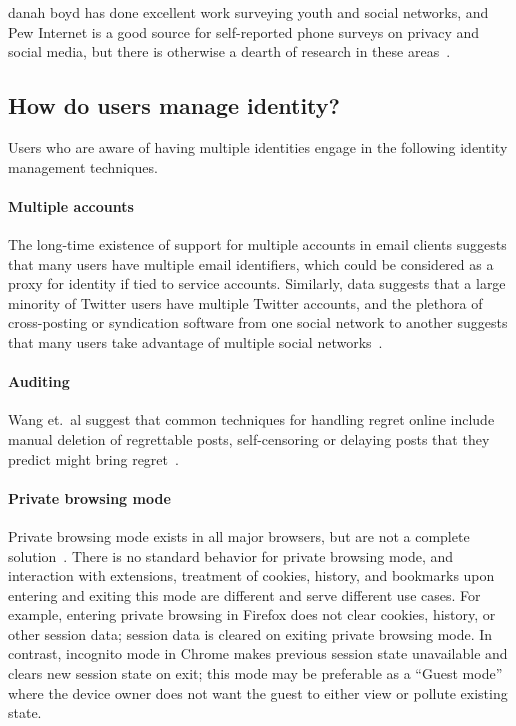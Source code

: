 \documentclass[10pt, conference, compsocconf]{IEEEtran}
\begin{document}
danah boyd has done excellent work surveying youth and social networks, and Pew
Internet is a good source for self-reported phone surveys on privacy and social
media, but there is otherwise a dearth of research in these
areas~\cite{boyd,pew1,pew2,pew3}.

\subsection{How do users manage identity?}

Users who are aware of having multiple identities engage in the following
identity management techniques.

\paragraph{Multiple accounts}
The long-time existence of support for multiple accounts in email clients
suggests that many users have multiple email identifiers, which could be
considered as a proxy for identity if tied to service accounts. Similarly, data
suggests that a large minority of Twitter users have multiple Twitter accounts,
and the plethora of cross-posting or syndication software from one social
network to another suggests that many users take advantage of multiple social
networks~\cite{twitter}.
\begin{comment}
That is not to say that all users have the same
tolerance or even need for multiple explicit identities: in fact many users may
be exclusively task-oriented and use the Internet with specific tasks in mind
rather than for social interaction or exploratory surfing\footnote{Even these
users are subject to building implicit identities through the use of tracking
techniques, however.}.
\end{comment}

\paragraph{Auditing}
Wang et.~al suggest that common techniques for handling regret online include
manual deletion of regrettable posts, self-censoring or delaying
posts that they predict might bring regret~\cite{wang}.

\paragraph{Private browsing mode}
Private browsing mode exists in all major browsers, but are not a complete
solution~\cite{ABBJ10}. There is no standard behavior for private browsing
mode, and interaction with extensions, treatment of cookies, history, and
bookmarks upon entering and exiting this mode are different and serve different
use cases. For example, entering private browsing in Firefox does not clear
cookies, history, or other session data; session data is cleared on exiting
private browsing mode. In contrast, incognito mode in Chrome makes previous
session state unavailable and clears new session state on exit; this mode
may be preferable as a ``Guest mode'' where the device owner does not want the
guest to either view or pollute existing state.
\end{document}
